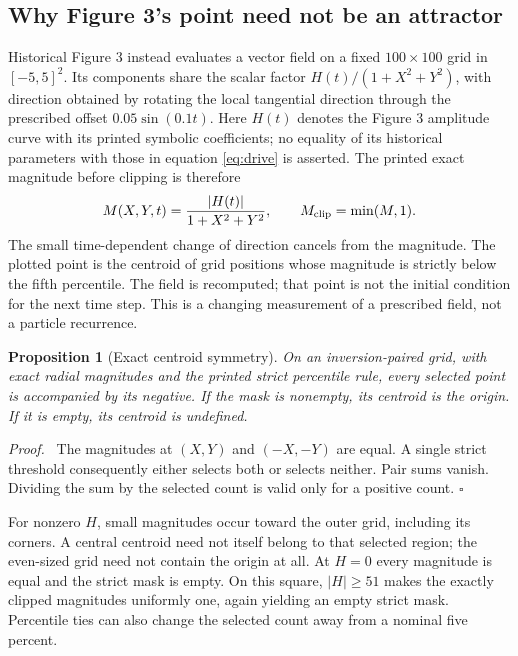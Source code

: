 \documentclass[11pt,a4paper]{article}
\newenvironment{proof}{\par\noindent\textit{Proof.}\ }{\hfill$\square$\par}
\newtheorem{proposition}[theorem]{Proposition}
\numberwithin{equation}{section}
\begin{document}
\subsection{Why Figure 3's point need not be an attractor}
Historical Figure 3 instead evaluates a vector field on a fixed $100\times100$ grid in $[-5,5]^2$. Its components share the scalar factor $H(t)/(1+X^2+Y^2)$, with direction obtained by rotating the local tangential direction through the prescribed offset $0.05\sin(0.1t)$. Here $H(t)$ denotes the Figure 3 amplitude curve with its printed symbolic coefficients; no equality of its historical parameters with those in equation \eqref{eq:drive} is asserted. The printed exact magnitude before clipping is therefore
\begin{equation}\label{eq:field}
M(X,Y,t)=\frac{|H(t)|}{1+X^2+Y^2},\qquad M_{\rm clip}=\min(M,1).
\end{equation}
The small time-dependent change of direction cancels from the magnitude. The plotted point is the centroid of grid positions whose magnitude is strictly below the fifth percentile. The field is recomputed; that point is not the initial condition for the next time step. This is a changing measurement of a prescribed field, not a particle recurrence.

\begin{proposition}[Exact centroid symmetry]\label{thm:centroid}
On an inversion-paired grid, with exact radial magnitudes and the printed strict percentile rule, every selected point is accompanied by its negative. If the mask is nonempty, its centroid is the origin. If it is empty, its centroid is undefined.
\end{proposition}
\begin{proof}
The magnitudes at $(X,Y)$ and $(-X,-Y)$ are equal. A single strict threshold consequently either selects both or selects neither. Pair sums vanish. Dividing the sum by the selected count is valid only for a positive count.
\end{proof}

For nonzero $H$, small magnitudes occur toward the outer grid, including its corners. A central centroid need not itself belong to that selected region; the even-sized grid need not contain the origin at all. At $H=0$ every magnitude is equal and the strict mask is empty. On this square, $|H|\ge51$ makes the exactly clipped magnitudes uniformly one, again yielding an empty strict mask. Percentile ties can also change the selected count away from a nominal five percent.
\end{document}
